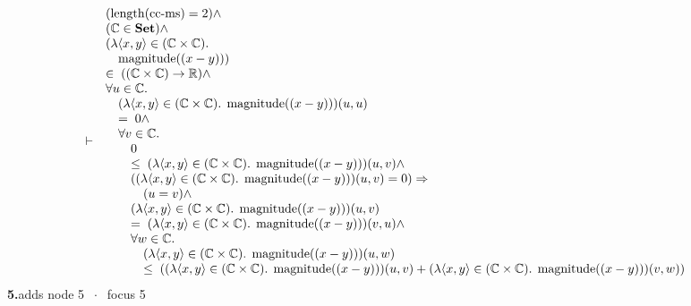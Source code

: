 \documentclass[11pt]{article}
\theoremstyle{plain}
\newcommand{\fit}[1]{\resizebox{\ifdim\width>\linewidth\linewidth\else\width\fi}{!}{#1}}
\begin{document}
\begin{align*}
  \vdash\quad & \begin{array}{@{}l@{}} (\operatorname{length}(\operatorname{cc\text{-}ms}) = 2) \wedge \\ (\mathbb{C} \in \mathbf{Set}) \wedge \\ (\lambda \langle x, y \rangle \in (\mathbb{C} \times \mathbb{C}).\; \\ \quad \operatorname{magnitude}((x - y))) \\ \in\; ((\mathbb{C} \times \mathbb{C}) \to \mathbb{R}) \wedge \\ \forall u \in \mathbb{C}. \\ \quad (\lambda \langle x, y \rangle \in (\mathbb{C} \times \mathbb{C}).\; \operatorname{magnitude}((x - y)))(u, u) \\ \quad =\; 0 \wedge \\ \quad \forall v \in \mathbb{C}. \\ \quad \quad 0 \\ \quad \quad \leq\; (\lambda \langle x, y \rangle \in (\mathbb{C} \times \mathbb{C}).\; \operatorname{magnitude}((x - y)))(u, v) \wedge \\ \quad \quad ((\lambda \langle x, y \rangle \in (\mathbb{C} \times \mathbb{C}).\; \operatorname{magnitude}((x - y)))(u, v) = 0) \Rightarrow  \\ \quad \quad \quad (u = v) \wedge \\ \quad \quad (\lambda \langle x, y \rangle \in (\mathbb{C} \times \mathbb{C}).\; \operatorname{magnitude}((x - y)))(u, v) \\ \quad \quad =\; (\lambda \langle x, y \rangle \in (\mathbb{C} \times \mathbb{C}).\; \operatorname{magnitude}((x - y)))(v, u) \wedge \\ \quad \quad \forall w \in \mathbb{C}. \\ \quad \quad \quad (\lambda \langle x, y \rangle \in (\mathbb{C} \times \mathbb{C}).\; \operatorname{magnitude}((x - y)))(u, w) \\ \quad \quad \quad \leq\; ((\lambda \langle x, y \rangle \in (\mathbb{C} \times \mathbb{C}).\; \operatorname{magnitude}((x - y)))(u, v) + (\lambda \langle x, y \rangle \in (\mathbb{C} \times \mathbb{C}).\; \operatorname{magnitude}((x - y)))(v, w)) \end{array}
\end{align*}
\medskip\noindent\textbf{5.}\quad \fit{\texttt{(lam-b)}}\hfill{\small adds node 5 $\;\cdot\;$ focus 5}\\[2pt]
\end{document}
